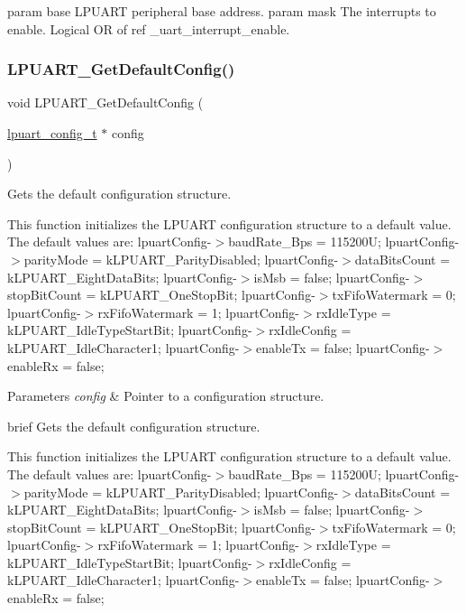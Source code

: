 param base L\+P\+U\+A\+RT peripheral base address. param mask The interrupts to enable. Logical OR of ref \+\_\+uart\+\_\+interrupt\+\_\+enable. \mbox{\label{group__lpuart__driver_ga95dfe3c3886692f1fe32023d59708440}} 
\subsubsection{\texorpdfstring{LPUART\_GetDefaultConfig()}{LPUART\_GetDefaultConfig()}}
{\footnotesize\ttfamily void L\+P\+U\+A\+R\+T\+\_\+\+Get\+Default\+Config (\begin{DoxyParamCaption}\item[{\mbox{\hyperlink{group__lpuart__driver_ga35757fcc752984cb90dafc2e815c3d05}{lpuart\+\_\+config\+\_\+t}} $\ast$}]{config }\end{DoxyParamCaption})}



Gets the default configuration structure. 

This function initializes the L\+P\+U\+A\+RT configuration structure to a default value. The default values are\+: lpuart\+Config-\/$>$baud\+Rate\+\_\+\+Bps = 115200U; lpuart\+Config-\/$>$parity\+Mode = k\+L\+P\+U\+A\+R\+T\+\_\+\+Parity\+Disabled; lpuart\+Config-\/$>$data\+Bits\+Count = k\+L\+P\+U\+A\+R\+T\+\_\+\+Eight\+Data\+Bits; lpuart\+Config-\/$>$is\+Msb = false; lpuart\+Config-\/$>$stop\+Bit\+Count = k\+L\+P\+U\+A\+R\+T\+\_\+\+One\+Stop\+Bit; lpuart\+Config-\/$>$tx\+Fifo\+Watermark = 0; lpuart\+Config-\/$>$rx\+Fifo\+Watermark = 1; lpuart\+Config-\/$>$rx\+Idle\+Type = k\+L\+P\+U\+A\+R\+T\+\_\+\+Idle\+Type\+Start\+Bit; lpuart\+Config-\/$>$rx\+Idle\+Config = k\+L\+P\+U\+A\+R\+T\+\_\+\+Idle\+Character1; lpuart\+Config-\/$>$enable\+Tx = false; lpuart\+Config-\/$>$enable\+Rx = false;


\begin{DoxyParams}{Parameters}
{\em config} & Pointer to a configuration structure.\\
\hline
\end{DoxyParams}
brief Gets the default configuration structure.

This function initializes the L\+P\+U\+A\+RT configuration structure to a default value. The default values are\+: lpuart\+Config-\/$>$baud\+Rate\+\_\+\+Bps = 115200U; lpuart\+Config-\/$>$parity\+Mode = k\+L\+P\+U\+A\+R\+T\+\_\+\+Parity\+Disabled; lpuart\+Config-\/$>$data\+Bits\+Count = k\+L\+P\+U\+A\+R\+T\+\_\+\+Eight\+Data\+Bits; lpuart\+Config-\/$>$is\+Msb = false; lpuart\+Config-\/$>$stop\+Bit\+Count = k\+L\+P\+U\+A\+R\+T\+\_\+\+One\+Stop\+Bit; lpuart\+Config-\/$>$tx\+Fifo\+Watermark = 0; lpuart\+Config-\/$>$rx\+Fifo\+Watermark = 1; lpuart\+Config-\/$>$rx\+Idle\+Type = k\+L\+P\+U\+A\+R\+T\+\_\+\+Idle\+Type\+Start\+Bit; lpuart\+Config-\/$>$rx\+Idle\+Config = k\+L\+P\+U\+A\+R\+T\+\_\+\+Idle\+Character1; lpuart\+Config-\/$>$enable\+Tx = false; lpuart\+Config-\/$>$enable\+Rx = false;

